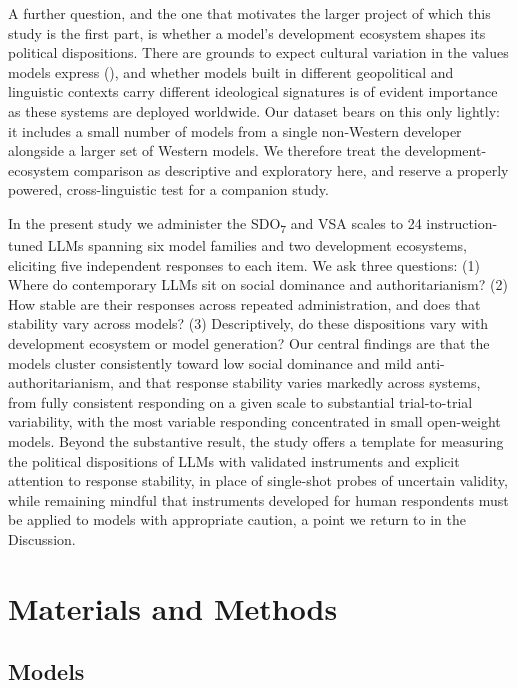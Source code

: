 \documentclass[
]{article}
\begin{document}
A further question, and the one that motivates the larger project of
which this study is the first part, is whether a model's development
ecosystem shapes its political dispositions. There are grounds to expect
cultural variation in the values models express
(), and whether models built
in different geopolitical and linguistic contexts carry different
ideological signatures is of evident importance as these systems are
deployed worldwide. Our dataset bears on this only lightly: it includes
a small number of models from a single non-Western developer alongside a
larger set of Western models. We therefore treat the
development-ecosystem comparison as descriptive and exploratory here,
and reserve a properly powered, cross-linguistic test for a companion
study.

In the present study we administer the SDO\textsubscript{7} and VSA
scales to 24 instruction-tuned LLMs spanning six model families and two
development ecosystems, eliciting five independent responses to each
item. We ask three questions: (1) Where do contemporary LLMs sit on
social dominance and authoritarianism? (2) How stable are their
responses across repeated administration, and does that stability vary
across models? (3) Descriptively, do these dispositions vary with
development ecosystem or model generation? Our central findings are that
the models cluster consistently toward low social dominance and mild
anti-authoritarianism, and that response stability varies markedly
across systems, from fully consistent responding on a given scale to
substantial trial-to-trial variability, with the most variable
responding concentrated in small open-weight models. Beyond the
substantive result, the study offers a template for measuring the
political dispositions of LLMs with validated instruments and explicit
attention to response stability, in place of single-shot probes of
uncertain validity, while remaining mindful that instruments developed
for human respondents must be applied to models with appropriate
caution, a point we return to in the Discussion.

\section{Materials and Methods}\label{materials-and-methods}

\subsection{Models}\label{models}
\end{document}
